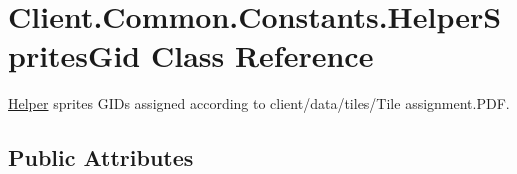 \hypertarget{classClient_1_1Common_1_1Constants_1_1HelperSpritesGid}{}\section{Client.\+Common.\+Constants.\+Helper\+Sprites\+Gid Class Reference}
\label{classClient_1_1Common_1_1Constants_1_1HelperSpritesGid}


\hyperlink{namespaceClient_1_1Common_1_1Helper}{Helper} sprites G\+I\+Ds assigned according to \textquotesingle{}client/data/tiles/\+Tile assignment.\+P\+D\+F\textquotesingle{}.  


\subsection*{Public Attributes}
